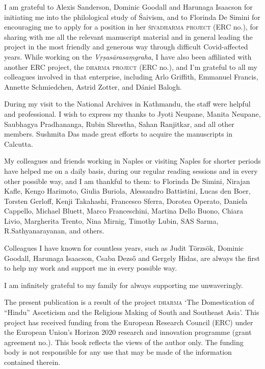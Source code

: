 \documentclass[11pt]{book}
\begin{document}
\noindent
I am grateful to Alexis Sanderson, Dominic Goodall and 
Harunaga Isaacson for initiating me into the philological 
study of Śaivism, and to Florinda De Simini for
encouraging me to apply for a position in her 
\textsc{\hbox{śivadharma} project} (ERC no.),
for sharing with me all the relevant manuscript material and
in general leading the project in the most friendly and 
generous way through difficult Covid-affected years.  
While working on the \textsl{Vṛṣa\-sāra\-saṃgraha}, 
I have also been affiliated with another ERC project, 
the \textsc{dharma project} (ERC no.), 
and I'm grateful to all my colleagues involved in that enterprise,
including Arlo Griffith, Emmanuel Francis, Annette Schmiedchen, 
Astrid Zotter, and Dániel Balogh.

During my visit to the National Archives in Kathmandu, 
the staff were helpful and professional. I wish to express my thanks to Jyoti Neupane, Manita Neupane, Saubhagya Pradhananga, Rubin Shrestha, Sahan Ranjitkar, and all %
other members. Sushmita Das made great efforts to acquire the manuscripts in Calcutta.

My colleagues and friends working in Naples or visiting Naples for shorter periods have helped me on a daily basis, during our regular reading sessions and in every other possible way, and I am thankful to them: to Florinda De Simini, Nirajan Kafle, Kengo Harimoto, Giulia Buriola, Alessandro Battistini, Lucas den Boer, Torsten Gerloff, Kenji Takahashi, Francesco Sferra, Dorotea Operato, Daniela Cappello, Michael Bluett, Marco Franceschini, Martina Dello Buono, Chiara Livio, Margherita Trento, Nina Mirnig, Timothy Lubin, SAS Sarma, R.\thinspace Sathyanarayanan, and others.

Colleagues I have known for countless years, such as Judit Törzsök, Dominic Goodall, Harunaga Isaacson, Csaba Dezső 
and Gergely Hidas, are always the first
to help my work and support me in every possible way.

I am infinitely grateful to my family for always supporting me unwaveringly.

\bigskip

\noindent
{\footnotesize
The present publication is a result of the project \textsc{dharma} `The
Domestication of ``Hindu'' Asceticism and the Religious Making of South and Southeast Asia'.  This project has received funding from the European Research Council (ERC) under the European Union's Horizon 2020 research and innovation programme (grant agreement no.).  This book reflects the views of the author only.  The funding body is not responsible for any use that
may be made of the information contained therein.}
\end{document}
